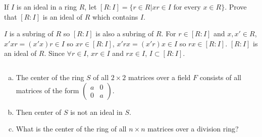 $$ $$

\begin{ex}
    If $I$ is an ideal in a ring $R$, let $\left[R:I\right]=\{r\in R|xr\in I \text{ for every }x\in R\}$. Prove that $\left[ R:I\right]$ is an ideal of $R$ which contains $I$.
\end{ex}

\begin{answer}
    $I$ is a subring of $R$ so $\left[R:I\right]$ is also a subring of $R$. For $r\in\left[R:I\right]$ and $x, x'\in R$, $x'xr=(x'x)r\in I$ so $xr\in \left[R:I\right]$, $x'rx=(x'r)x\in I$ so $rx\in \left[R:I\right]$. $\left[R:I\right]$ is an ideal of $R$. Since $\forall r\in I$, $xr\in I$ and $rx\in I$, $I\subset \left[R:I\right]$.
\end{answer}

$$ $$

\begin{ex}
    \begin{enumerate}[(a)]
        \item The center of the ring $S$ of all $2\times 2$ matrices over a field $F$ consists of all matrices of the form $\begin{pmatrix}
            a&0\\0&a
        \end{pmatrix}$.
        \item Then center of $S$ is not an ideal in $S$.
        \item What is the center of the ring of all $n\times n$ matrices over a division ring?
    \end{enumerate}
\end{ex}

